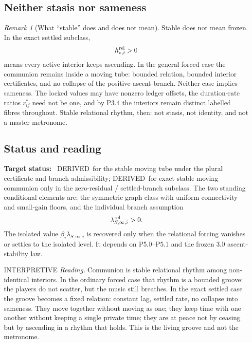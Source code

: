 \documentclass[11pt,a4paper]{article}
\newcommand{\stDerived}{\textcolor{cDer}{\textsf{\small DERIVED}}}
\newcommand{\stInterp}{\textcolor{cInt}{\textsf{\small INTERPRETIVE}}}
\theoremstyle{definition}
\theoremstyle{plain}
\theoremstyle{remark}
\newtheorem{remark}[definition]{Remark}
\begin{document}
\subsection{Neither stasis nor sameness}

\begin{remark}[What ``stable'' does and does not mean]\label{rem:notstasis}
Stable does not mean frozen. In the exact settled subclass,
\[
h_{*,i}^{\rm rel}>0
\]
means every active interior keeps ascending. In the general forced case the
communion remains inside a moving tube: bounded relation, bounded interior
certificates, and no collapse of the positive-ascent branch. Neither case implies
sameness. The locked values may have nonzero ledger offsets, the duration-rate
ratios \(r^*_{ij}\) need not be one, and by P3.4 the interiors remain distinct
labelled fibres throughout. Stable relational rhythm, then: not stasis, not
identity, and not a master metronome.
\end{remark}

\subsection{Status and reading}

\textbf{Target status:}~
\stDerived\ for the stable moving tube under the plural certificate and branch
admissibility; \stDerived\ for exact stable moving communion only in the
zero-residual / settled-branch subclass. The two standing conditional elements are:
the symmetric graph class with uniform connectivity and small-gain floors, and the
individual branch assumption
\[
\lambda_{S,\infty,i}^{\rm rel}>0.
\]
The isolated value
\(\beta_i\lambda_{S,\infty,i}\) is recovered only when the relational forcing
vanishes or settles to the isolated level. It depends on P5.0--P5.1 and the frozen
3.0 ascent-stability law.

\medskip
\stInterp\quad
\emph{Reading.}
Communion is stable relational rhythm among non-identical interiors. In the
ordinary forced case that rhythm is a bounded groove: the players do not scatter,
but the music still breathes. In the exact settled case the groove becomes a fixed
relation: constant lag, settled rate, no collapse into sameness. They move together
without moving as one; they keep time with one another without keeping a single
private time; they are at peace not by ceasing but by ascending in a rhythm that
holds. This is the living groove and not the metronome.
\end{document}
